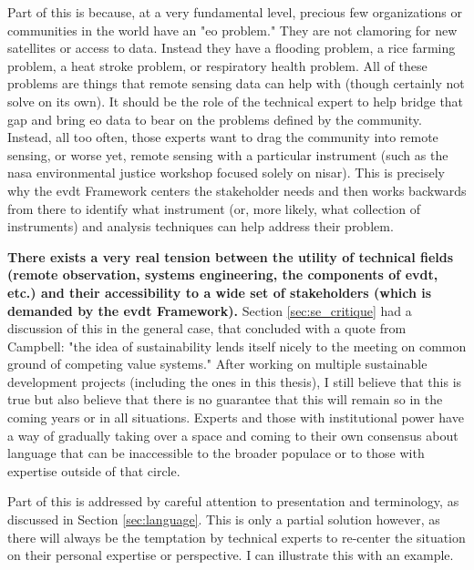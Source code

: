 Part of this is because, at a very fundamental level, precious few organizations or communities in the world have an "\ac{eo} problem." They are not clamoring for new satellites or access to data. Instead they have a flooding problem, a rice farming problem, a heat stroke problem, or respiratory health problem. All of these problems are things that remote sensing data can help with (though certainly not solve on its own). It should be the role of the technical expert to help bridge that gap and bring \ac{eo} data to bear on the problems defined by the community. Instead, all too often, those experts want to drag the community into remote sensing, or worse yet, remote sensing with a particular instrument (such as the \ac{nasa} environmental justice workshop focused solely on \ac{nisar}). This is precisely why the \ac{evdt} Framework centers the stakeholder needs and then works backwards from there to identify what instrument (or, more likely, what collection of instruments) and analysis techniques can help address their problem.

\textbf{There exists a very real tension between the utility of technical fields (remote observation, systems engineering, the components of \ac{evdt}, etc.) and their accessibility to a wide set of stakeholders (which is demanded by the \ac{evdt} Framework).} Section \ref{sec:se_critique} had a discussion of this in the general case, that concluded with a quote from Campbell: "the idea of sustainability lends itself nicely to the meeting on common ground of competing value systems." After working on multiple sustainable development projects (including the ones in this thesis), I still believe that this is true but also believe that there is no guarantee that this will remain so in the coming years or in all situations. Experts and those with institutional power have a way of gradually taking over a space and coming to their own consensus about language that can be inaccessible to the broader populace or to those with expertise outside of that circle.

Part of this is addressed by careful attention to presentation and terminology, as discussed in Section \ref{sec:language}. This is only a partial solution however, as there will always be the temptation by technical experts to re-center the situation on their personal expertise or perspective. I can illustrate this with an example.

